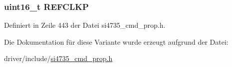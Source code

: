\subsubsection[{R\+E\+F\+C\+L\+K\+P}]{\setlength{\rightskip}{0pt plus 5cm}uint16\+\_\+t R\+E\+F\+C\+L\+K\+P}\label{unionrefclk__pre_a546b4baeb928274149bafc12e1b720ff}


Definiert in Zeile 443 der Datei si4735\+\_\+cmd\+\_\+prop.\+h.



Die Dokumentation für diese Variante wurde erzeugt aufgrund der Datei\+:\begin{DoxyCompactItemize}
\item 
driver/include/\hyperlink{si4735__cmd__prop_8h}{si4735\+\_\+cmd\+\_\+prop.\+h}\end{DoxyCompactItemize}
